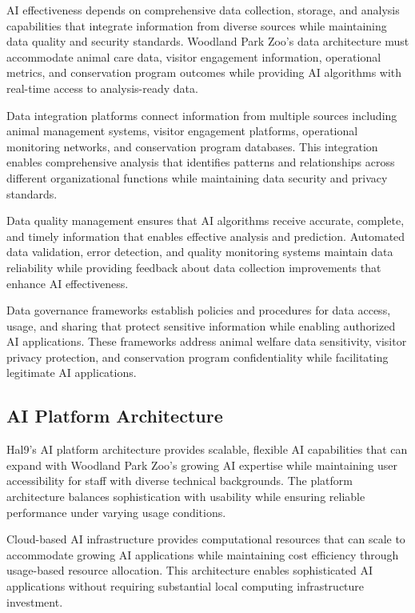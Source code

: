 \documentclass[
  Letterpaper,
]{scrbook}
\begin{document}
AI effectiveness depends on comprehensive data collection, storage, and
analysis capabilities that integrate information from diverse sources
while maintaining data quality and security standards. Woodland Park
Zoo's data architecture must accommodate animal care data, visitor
engagement information, operational metrics, and conservation program
outcomes while providing AI algorithms with real-time access to
analysis-ready data.

Data integration platforms connect information from multiple sources
including animal management systems, visitor engagement platforms,
operational monitoring networks, and conservation program databases.
This integration enables comprehensive analysis that identifies patterns
and relationships across different organizational functions while
maintaining data security and privacy standards.

Data quality management ensures that AI algorithms receive accurate,
complete, and timely information that enables effective analysis and
prediction. Automated data validation, error detection, and quality
monitoring systems maintain data reliability while providing feedback
about data collection improvements that enhance AI effectiveness.

Data governance frameworks establish policies and procedures for data
access, usage, and sharing that protect sensitive information while
enabling authorized AI applications. These frameworks address animal
welfare data sensitivity, visitor privacy protection, and conservation
program confidentiality while facilitating legitimate AI applications.

\subsection{AI Platform Architecture}\label{ai-platform-architecture}

Hal9's AI platform architecture provides scalable, flexible AI
capabilities that can expand with Woodland Park Zoo's growing AI
expertise while maintaining user accessibility for staff with diverse
technical backgrounds. The platform architecture balances sophistication
with usability while ensuring reliable performance under varying usage
conditions.

Cloud-based AI infrastructure provides computational resources that can
scale to accommodate growing AI applications while maintaining cost
efficiency through usage-based resource allocation. This architecture
enables sophisticated AI applications without requiring substantial
local computing infrastructure investment.
\end{document}
